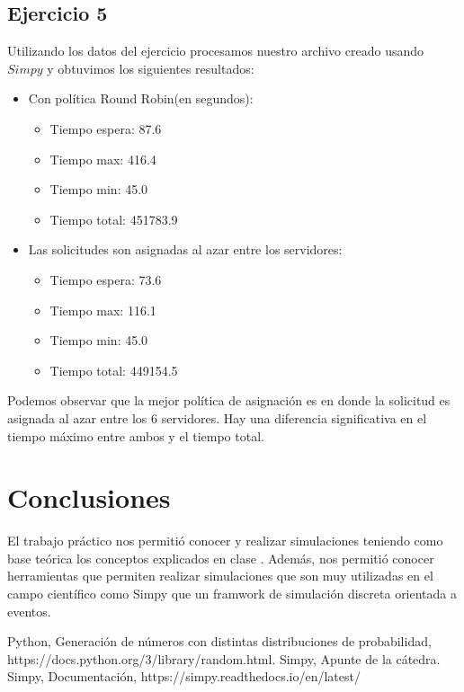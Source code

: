 \documentclass[11pt,a4paper]{article}
\begin{document}
	\subsection{Ejercicio 5}
		Utilizando los datos del ejercicio procesamos nuestro archivo creado usando $Simpy$ y obtuvimos los siguientes resultados:
		\begin{itemize}
			\item Con política Round Robin(en segundos):
				\begin{itemize}
					\item Tiempo espera: 87.6
					\item Tiempo max: 416.4
					\item Tiempo min: 45.0
					\item Tiempo total: 451783.9
				\end{itemize}
			\item Las solicitudes son asignadas al azar entre los servidores:
				\begin{itemize}
					\item Tiempo espera: 73.6
					\item Tiempo max: 116.1
					\item Tiempo min: 45.0
					\item Tiempo total: 449154.5
				\end{itemize}
		\end{itemize}

		Podemos observar que la mejor política de asignación es en donde la solicitud es asignada al azar entre los 6 servidores. Hay una diferencia significativa en el tiempo máximo entre ambos y el tiempo total.

\section{Conclusiones}
El trabajo práctico nos permitió conocer y realizar simulaciones teniendo como base teórica los conceptos explicados en clase . Además, nos permitió conocer herramientas que permiten realizar simulaciones que son muy utilizadas en el campo científico como Simpy que un framwork de simulación discreta orientada a eventos.

\begin{thebibliography}{10}
	\bibitem{} Python, Generación de números con distintas distribuciones de probabilidad, https://docs.python.org/3/library/random.html.
	\bibitem{} Simpy, Apunte de la cátedra.
	\bibitem{} Simpy, Documentación, https://simpy.readthedocs.io/en/latest/
	

\end{thebibliography}
\end{document}
